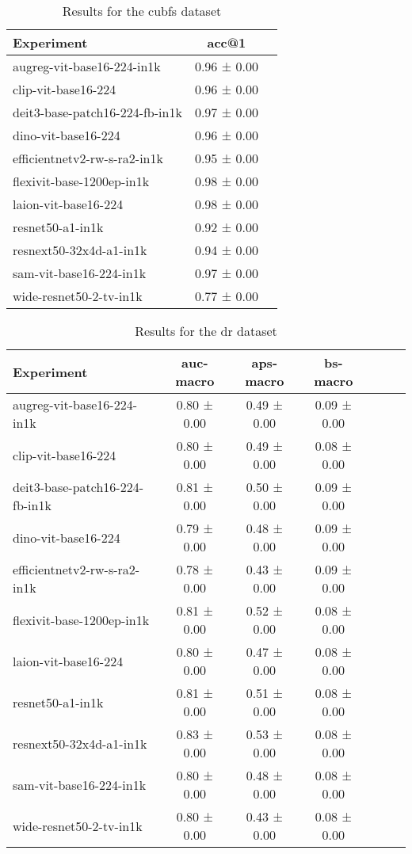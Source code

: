 \begin{table}[htbp]
\caption{Results for the cubfs dataset}
\begin{tabular}{|l|c|c|}\hline
Experiment & acc@1\\
\hline
augreg-vit-base16-224-in1k & 0.96 ± 0.00\\
\hline
clip-vit-base16-224 & 0.96 ± 0.00\\
\hline
deit3-base-patch16-224-fb-in1k & 0.97 ± 0.00\\
\hline
dino-vit-base16-224 & 0.96 ± 0.00\\
\hline
efficientnetv2-rw-s-ra2-in1k & 0.95 ± 0.00\\
\hline
flexivit-base-1200ep-in1k & 0.98 ± 0.00\\
\hline
laion-vit-base16-224 & 0.98 ± 0.00\\
\hline
resnet50-a1-in1k & 0.92 ± 0.00\\
\hline
resnext50-32x4d-a1-in1k & 0.94 ± 0.00\\
\hline
sam-vit-base16-224-in1k & 0.97 ± 0.00\\
\hline
wide-resnet50-2-tv-in1k & 0.77 ± 0.00\\
\hline
\end{tabular}
\end{table}

\begin{table}[htbp]
\caption{Results for the dr dataset}
\begin{tabular}{|l|c|c|c|c|c|c|}\hline
Experiment & auc-macro & aps-macro & bs-macro\\
\hline
augreg-vit-base16-224-in1k & 0.80 ± 0.00 & 0.49 ± 0.00 & 0.09 ± 0.00\\
\hline
clip-vit-base16-224 & 0.80 ± 0.00 & 0.49 ± 0.00 & 0.08 ± 0.00\\
\hline
deit3-base-patch16-224-fb-in1k & 0.81 ± 0.00 & 0.50 ± 0.00 & 0.09 ± 0.00\\
\hline
dino-vit-base16-224 & 0.79 ± 0.00 & 0.48 ± 0.00 & 0.09 ± 0.00\\
\hline
efficientnetv2-rw-s-ra2-in1k & 0.78 ± 0.00 & 0.43 ± 0.00 & 0.09 ± 0.00\\
\hline
flexivit-base-1200ep-in1k & 0.81 ± 0.00 & 0.52 ± 0.00 & 0.08 ± 0.00\\
\hline
laion-vit-base16-224 & 0.80 ± 0.00 & 0.47 ± 0.00 & 0.08 ± 0.00\\
\hline
resnet50-a1-in1k & 0.81 ± 0.00 & 0.51 ± 0.00 & 0.08 ± 0.00\\
\hline
resnext50-32x4d-a1-in1k & 0.83 ± 0.00 & 0.53 ± 0.00 & 0.08 ± 0.00\\
\hline
sam-vit-base16-224-in1k & 0.80 ± 0.00 & 0.48 ± 0.00 & 0.08 ± 0.00\\
\hline
wide-resnet50-2-tv-in1k & 0.80 ± 0.00 & 0.43 ± 0.00 & 0.08 ± 0.00\\
\hline
\end{tabular}
\end{table}

